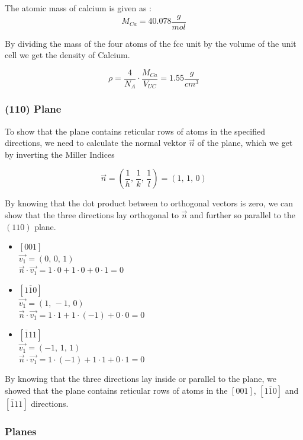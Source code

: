 The atomic mass of calcium is given as \cite{lenntech_chemical_elements}:
$$M_{Ca} = 40.078 \frac{g}{mol}$$

By dividing the mass of the four atoms of the fcc unit by the volume of the
unit cell we get the density of Calcium.

$$\rho = \frac{4}{N_A} \cdot \frac{M_{Ca}}{V_{UC}} = 1.55 \frac{g}{cm^3}$$

\subsubsection*{(110) Plane}

To show that the plane contains reticular rows of atoms in the specified
directions, we need to calculate the normal
vektor $\vec{n}$ of the plane, which we get by inverting the Miller Indices

$$\vec{n} = (\frac{1}{h} ,\, \frac{1}{k} ,\, \frac{1}{l}) = (1, \, 1,\, 0)$$

By knowing that the dot product between to orthogonal vectors is zero, we can show
that the three directions lay orthogonal to $\vec{n}$ and further so parallel
to the $(110)$ plane.

\begin{itemize}
	\item 	$[001]$\\
			$\vec{v_1} = (0, \, 0,\, 1)$\\
			$\vec{n} \cdot \vec{v_1} = 1 \cdot 0 + 1 \cdot 0 + 0 \cdot 1 = 0$
\end{itemize}
\begin{itemize}
	\item 	$[1\overline{1}0]$\\
			$\vec{v_1} = (1, \, -1,\, 0)$\\
			$\vec{n} \cdot \vec{v_1} = 1 \cdot 1 + 1 \cdot (-1) + 0 \cdot 0 = 0$
\end{itemize}
\begin{itemize}
	\item 	$[\overline{1}11]$\\
			$\vec{v_1} = (-1, \, 1,\, 1)$\\
			$\vec{n} \cdot \vec{v_1} = 1 \cdot (-1) + 1 \cdot 1 + 0 \cdot 1 = 0$
\end{itemize}

By knowing that the three directions lay inside or parallel to the plane, we
showed that the plane contains reticular rows of atoms in the $[001]$, $[1\overline{1}0]$
and $[\overline{1}11]$ directions.

\subsubsection*{Planes}

